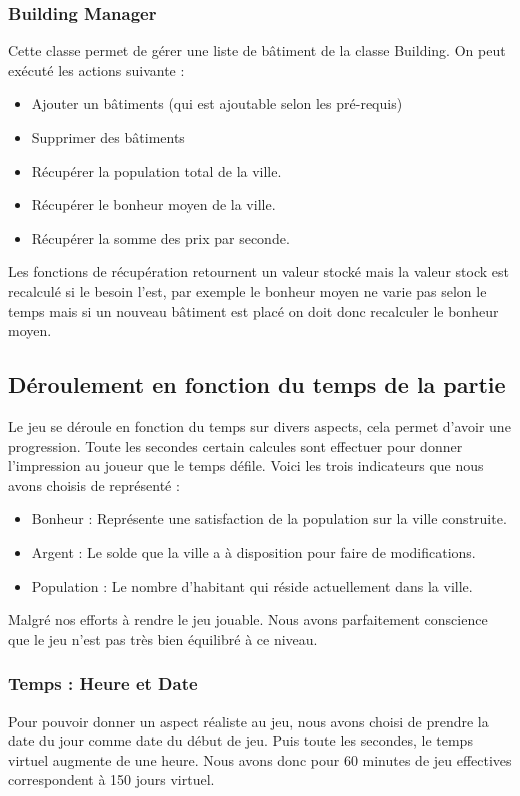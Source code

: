 \documentclass[a4paper,10pt,openany,oneside]{report}
\begin{document}
\subsubsection{Building Manager}
Cette classe permet de gérer une liste de bâtiment de la classe Building. On peut exécuté les actions suivante :
\begin{itemize}
	\item Ajouter un bâtiments (qui est ajoutable selon les pré-requis)
	\item Supprimer des bâtiments 
	\item Récupérer la population total de la ville.
	\item Récupérer le bonheur moyen de la ville.
	\item Récupérer la somme des prix par seconde.
\end{itemize}

Les fonctions de récupération retournent un valeur stocké mais la valeur stock est recalculé si le besoin l'est, par exemple le bonheur moyen ne varie pas selon le temps mais si un nouveau bâtiment est placé on doit donc recalculer le bonheur moyen.

\subsection{Déroulement en fonction du temps de la partie}
Le jeu se déroule en fonction du temps sur divers aspects, cela permet d'avoir une progression. Toute les secondes certain calcules sont effectuer pour donner l'impression au joueur que le temps défile. Voici les trois indicateurs que nous avons choisis de représenté :
\begin{itemize}
	\item Bonheur : Représente une satisfaction de la population sur la ville construite.
	\item Argent : Le solde que la ville a à disposition pour faire de modifications.
	\item Population : Le nombre d'habitant qui réside actuellement dans la ville.
\end{itemize}
Malgré nos efforts à rendre le jeu jouable. Nous avons parfaitement conscience que le jeu n'est pas très bien équilibré à ce niveau.
\subsubsection{Temps : Heure et Date}
Pour pouvoir donner un aspect réaliste au jeu, nous avons choisi de prendre la date du jour comme date du début de jeu. Puis toute les secondes, le temps virtuel augmente de une heure. Nous avons donc pour 60 minutes de jeu effectives correspondent à 150 jours virtuel.
\end{document}

